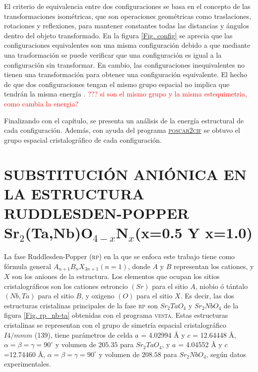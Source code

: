 El criterio de equivalencia entre dos configuraciones se basa en el concepto de las transformaciones isométricas, que son operaciones geométricas como traslaciones, rotaciones y reflexiones, para mantener constantes todas las distancias y ángulos dentro del objeto transformado. En la figura \ref{Fig. config} se aprecia que las configuraciones equivalentes son una misma configuración debido a que mediante una trasformación se puede verificar que una configuración es igual a la configuración sin transformar. En cambio, las configuraciones inequivalentes no tienen una transformación para obtener una configuración equivalente. El hecho de que dos configuraciones tengan el mismo grupo espacial no implica que tendrán la misma energía \cite{Grau-Crespo2007}. \textcolor{red}{??? si son el mismo grupo y la misma estequimetria, como cambia la energia?}

Finalizando con el capítulo, se presenta un análisis de la energía estructural de cada configuración. Además, con ayuda del programa \href{https://uspex-team.org/online_utilities/poscar2cif/}{\textsc{poscar2cif}}\cite{urlposcar2cif} se obtuvo el grupo espacial cristalográfico de cada configuración.

\section{SUBSTITUCIÓN ANIÓNICA EN LA ESTRUCTURA RUDDLESDEN-POPPER\\ Sr$_{2}$(Ta,Nb)O$_{4-x}$N$_{x}$(x=0.5 Y x=1.0)}
La fase Ruddlesden-Popper (\textsc{rp}) en la que se enfoca este trabajo tiene como fórmula general $A_{n+1}B_{n}X_{3n+1}(n=1)$, donde $A$ y $B$ representan los cationes, y $X$ son los aniones de la estructura\cite{Beznosikov2000}. Los elementos que ocupan los sitios cristalográficos son los cationes estroncio $(Sr)$ para el sitio $A$, niobio ó tántalo $(Nb,Ta)$ para el sitio $B$, y oxigeno $(O)$ para el sitio $X$. Es decir, las dos estructuras cristalinas principales de la fase \textsc{rp} son $Sr_{2}TaO_{4}$ y $Sr_{2}NbO_{4}$ de la figura \ref{Fig. rp_nb-ta} obtenidas con el programa \textsc{vesta}\cite{Momma2011}. 
Estas estructuras cristalinas se representan con el grupo de simetría espacial cristalográfico $I4/mmm$ (139), tiene parámetros de celda $a$ = 4.02994 \r{A} y $c$ = 12.64448 \r{A},  $\alpha=\beta=\gamma=90^{\circ}$ y volumen de $205.35$ para $Sr_{2}TaO_{4}$, y $a$ = 4.04552 \r{A} y $c$ =12.74460 \r{A},  $\alpha=\beta=\gamma=90^{\circ}$ y volumen de $208.58$ para $Sr_{2}NbO_{4}$, según datos experimentales\cite{Clarke2002,Tobias2004,Diot1999CrystalN}.

